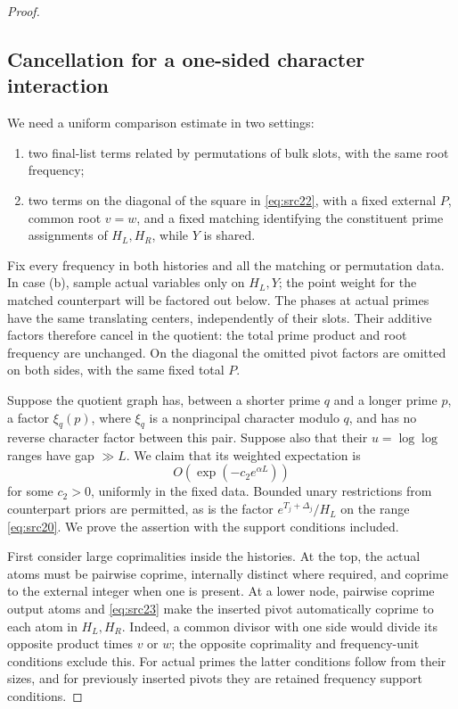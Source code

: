 \begin{proof}
\subsection*{Cancellation for a one-sided character interaction}

We need a uniform comparison estimate in two settings:
\begin{enumerate}[label=(\alph*)]
\item two final-list terms related by permutations of bulk slots,
with the same root frequency;
\item two terms on the diagonal of the square in
\eqref{eq:src22}, with a fixed external \(P\), common root
\(v=w\), and a fixed matching identifying the constituent
prime assignments of \(H_L,H_R\), while \(Y\) is shared.
\end{enumerate}
Fix every frequency in both histories and all the matching or
permutation data. In case (b), sample actual variables only on
\(H_L,Y\); the point weight for the matched counterpart will
be factored out below. The phases at actual primes have the
same translating centers, independently of their slots.
Their additive factors therefore cancel in the quotient:
the total prime product and root frequency are unchanged.
On the diagonal the omitted pivot factors are omitted on both
sides, with the same fixed total \(P\).

Suppose the quotient graph has, between a shorter prime \(q\)
and a longer prime \(p\), a factor
\(\xi_q(p)\), where \(\xi_q\) is a nonprincipal character
modulo \(q\), and has no reverse character factor between
this pair. Suppose also that their \(u=\log\log\) ranges have
gap \(\gg L\). We claim that its weighted expectation is
\begin{equation}\label{eq:characters-one-sided}
 O\!\left(\exp(-c_2e^{\alpha L})\right)
\end{equation}
for some \(c_2>0\), uniformly in the fixed data. Bounded unary
restrictions from counterpart priors are permitted, as is the
factor \(e^{T_j+\Delta_j}/H_L\) on the range
\eqref{eq:src20}. We prove the assertion with the support
conditions included.

First consider large coprimalities inside the histories.
At the top, the actual atoms must be pairwise coprime,
internally distinct where required, and coprime to the
external integer when one is present.
At a lower node, pairwise coprime output atoms and
\eqref{eq:src23} make the inserted pivot automatically
coprime to each atom in \(H_L,H_R\). Indeed, a common divisor
with one side would divide its opposite product times \(v\)
or \(w\); the opposite coprimality and frequency-unit
conditions exclude this. For actual primes the latter
conditions follow from their sizes, and for previously
inserted pivots they are retained frequency support conditions.


\end{proof}
